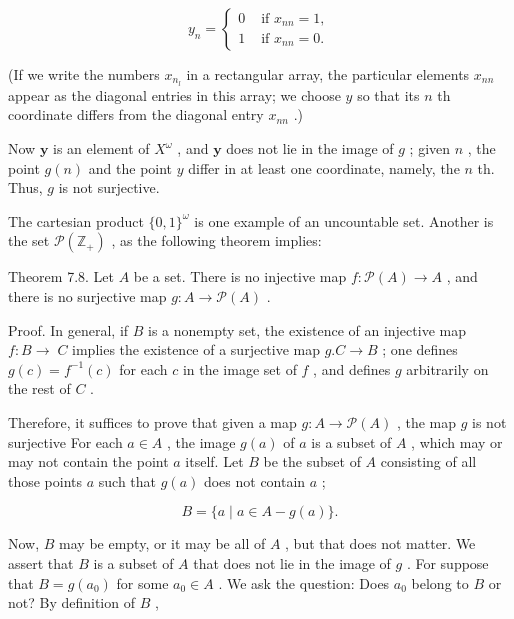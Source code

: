 \documentclass[10pt]{article}
\begin{document}
\[
{y}_{n} = \left\{  \begin{array}{ll} 0 & \text{ if }{x}_{nn} = 1, \\  1 & \text{ if }{x}_{nn} = 0. \end{array}\right.
\]

(If we write the numbers \({x}_{{n}_{l}}\) in a rectangular array, the particular elements \({x}_{nn}\) appear as the diagonal entries in this array; we choose \(y\) so that its \(n\) th coordinate differs from the diagonal entry \({x}_{nn}\) .)

Now \(\mathbf{y}\) is an element of \({X}^{\omega }\) , and \(\mathbf{y}\) does not lie in the image of \(g\) ; given \(n\) , the point \(g\left( n\right)\) and the point \(y\) differ in at least one coordinate, namely, the \(n\) th. Thus, \(g\) is not surjective.

The cartesian product \(\{ 0,1{\} }^{\omega }\) is one example of an uncountable set. Another is the set \(\mathcal{P}\left( {\mathbb{Z}}_{ + }\right)\) , as the following theorem implies:

Theorem 7.8. Let \(A\) be a set. There is no injective map \(f : \mathcal{P}\left( A\right)  \rightarrow  A\) , and there is no surjective map \(g : A \rightarrow  \mathcal{P}\left( A\right)\) .

Proof. In general, if \(B\) is a nonempty set, the existence of an injective map \(f : B \rightarrow \; C\) implies the existence of a surjective map \(g.C \rightarrow  B\) ; one defines \(g\left( c\right)  = {f}^{-1}\left( c\right)\) for each \(c\) in the image set of \(f\) , and defines \(g\) arbitrarily on the rest of \(C\) .

Therefore, it suffices to prove that given a map \(g : A \rightarrow  \mathcal{P}\left( A\right)\) , the map \(g\) is not surjective For each \(a \in  A\) , the image \(g\left( a\right)\) of \(a\) is a subset of \(A\) , which may or may not contain the point \(a\) itself. Let \(B\) be the subset of \(A\) consisting of all those points \(a\) such that \(g\left( a\right)\) does not contain \(a\) ;

\[
B = \{ a \mid  a \in  A - g\left( a\right) \} .
\]

Now, \(B\) may be empty, or it may be all of \(A\) , but that does not matter. We assert that \(B\) is a subset of \(A\) that does not lie in the image of \(g\) . For suppose that \(B = g\left( {a}_{0}\right)\) for some \({a}_{0} \in  A\) . We ask the question: Does \({a}_{0}\) belong to \(B\) or not? By definition of \(B\) ,
\end{document}
